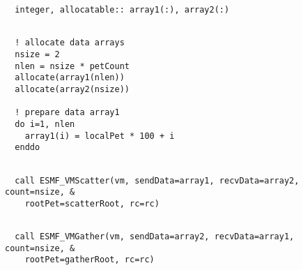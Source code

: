  \begin{verbatim}
  integer, allocatable:: array1(:), array2(:)
 
\end{verbatim}
 

 \begin{verbatim}
  ! allocate data arrays
  nsize = 2
  nlen = nsize * petCount
  allocate(array1(nlen))
  allocate(array2(nsize))

  ! prepare data array1
  do i=1, nlen
    array1(i) = localPet * 100 + i
  enddo
 
\end{verbatim}
 

 \begin{verbatim}
  call ESMF_VMScatter(vm, sendData=array1, recvData=array2, count=nsize, &
    rootPet=scatterRoot, rc=rc)
 
\end{verbatim}
 

 \begin{verbatim}
  call ESMF_VMGather(vm, sendData=array2, recvData=array1, count=nsize, &
    rootPet=gatherRoot, rc=rc)
 
\end{verbatim}
 

\setlength{\parskip}{\oldparskip}
\setlength{\parindent}{\oldparindent}
\setlength{\baselineskip}{\oldbaselineskip}
